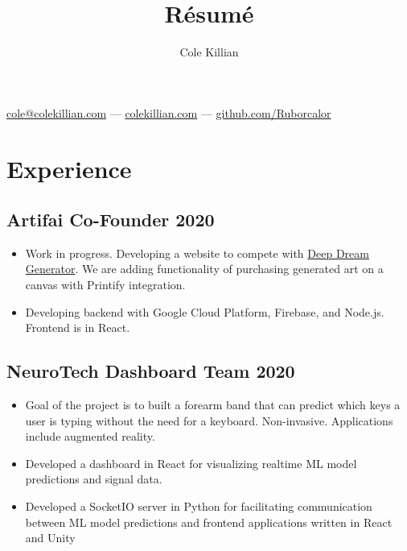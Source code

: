 \documentclass{article}
\makeatletter
\renewcommand{\maketitle}{
\begin{center}
{\color{green}\huge\bfseries
\theauthor}

\vspace{.25em}
\href{mailto:cole@colekillian.com}{cole@colekillian.com} --- \href{https://colekillian.com}{colekillian.com} --- \href{https://github.com/Ruborcalor}{github.com/Ruborcalor} 
\end{center}
}
\makeatother
\begin{document}
\title{R\'esum\'e}
\author{Cole Killian}

\maketitle
\thispagestyle{empty} 

\section{Experience}


\subsection{Artifai Co-Founder \hfill 2020}
\begin{itemize}[leftmargin=0.5in]
  \setlength\itemsep{0.00em}
\item Work in progress. Developing a website to compete with
  \href{https://deepdreamgenerator.com}{Deep Dream Generator}. We are adding
  functionality of purchasing generated art on a canvas with Printify integration.
\item Developing backend with Google Cloud Platform, Firebase, and Node.js. Frontend is in React.
\end{itemize}



\subsection{NeuroTech Dashboard Team \hfill 2020}
\begin{itemize}[leftmargin=0.5in]
  \setlength\itemsep{0.00em}
\item Goal of the project is to built a forearm band that can predict which keys a
  user is typing without the need for a keyboard. Non-invasive. Applications
  include augmented reality.
\item Developed a dashboard in React for visualizing realtime
  ML model predictions and signal data.
\item Developed a SocketIO server in Python for facilitating communication
  between ML model predictions and frontend applications written in React and Unity
\end{itemize}
\end{document}
